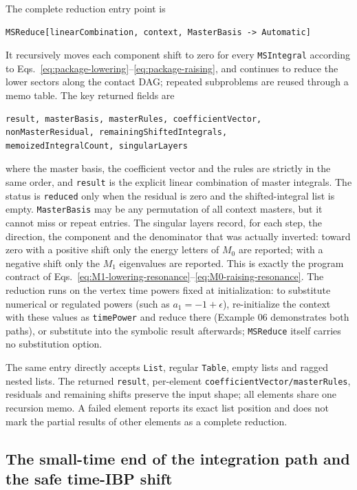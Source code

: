 \documentclass[11pt,a4paper]{article}
\begin{document}
The complete reduction entry point is
\begin{verbatim}
MSReduce[linearCombination, context, MasterBasis -> Automatic]
\end{verbatim}
It recursively moves each component shift to zero for every \texttt{MSIntegral} according to Eqs.~\eqref{eq:package-lowering}--\eqref{eq:package-raising}, and continues to reduce the lower sectors along the contact DAG; repeated subproblems are reused through a memo table. The key returned fields are
\begin{verbatim}
result, masterBasis, masterRules, coefficientVector,
nonMasterResidual, remainingShiftedIntegrals,
memoizedIntegralCount, singularLayers
\end{verbatim}
where the master basis, the coefficient vector and the rules are strictly in the same order, and \texttt{result} is the explicit linear combination of master integrals. The status is \texttt{reduced} only when the residual is zero and the shifted-integral list is empty. \texttt{MasterBasis} may be any permutation of all context masters, but it cannot miss or repeat entries. The singular layers record, for each step, the direction, the component and the denominator that was actually inverted: toward zero with a positive shift only the energy letters of $M_0$ are reported; with a negative shift only the $M_1$ eigenvalues are reported. This is exactly the program contract of Eqs.~\eqref{eq:M1-lowering-resonance}--\eqref{eq:M0-raising-resonance}. The reduction runs on the vertex time powers fixed at initialization: to substitute numerical or regulated powers (such as $a_1=-1+\epsilon$), re-initialize the context with these values as \texttt{timePower} and reduce there (Example 06 demonstrates both paths), or substitute into the symbolic result afterwards; \texttt{MSReduce} itself carries no substitution option.

The same entry directly accepts \texttt{List}, regular \texttt{Table}, empty lists and ragged
nested lists. The returned \texttt{result}, per-element
\texttt{coefficientVector/masterRules}, residuals and remaining shifts preserve the input shape;
all elements share one recursion memo. A failed element reports its exact list position and does
not mark the partial results of other elements as a complete reduction.

\subsection{The small-time end of the integration path and the safe time-IBP shift}
\label{sec:time-ibp-domain}
\end{document}
